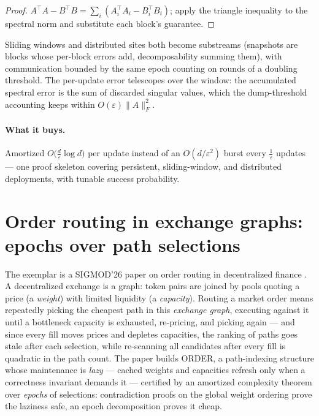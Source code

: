 \begin{proof}
$A^{\top} A - B^{\top} B = \sum_i (A_i^{\top} A_i - B_i^{\top} B_i)$;
apply the triangle inequality to the spectral norm and substitute each
block's guarantee.
\end{proof}

Sliding windows and distributed sites both become substreams (snapshots are
blocks whose per-block errors add, decomposability summing them), with
communication bounded by the same epoch counting on rounds of a doubling
threshold. The per-update error telescopes over the window: the
accumulated spectral error is the sum of discarded singular values, which
the dump-threshold accounting keeps within $O(\varepsilon)\|A\|_F^2$.

\paragraph{What it buys.}
Amortized $O\bigl(\tfrac{d}{\varepsilon} \log d\bigr)$ per update instead
of an $O(d/\varepsilon^2)$ burst every $\tfrac{1}{\varepsilon}$ updates ---
one proof skeleton covering persistent, sliding-window, and distributed
deployments, with tunable success probability.

\section{Order routing in exchange graphs: epochs over path selections}
\label{sec:amo-order}

The exemplar is a SIGMOD'26 paper on order routing in decentralized finance
\citep{sigmod26-180}. A decentralized exchange is a graph: token pairs are
joined by pools quoting a price (a \emph{weight}) with limited liquidity (a
\emph{capacity}). Routing a market order means repeatedly picking the
cheapest path in this \emph{exchange graph}, executing against it until a
bottleneck capacity is exhausted, re-pricing, and picking again --- and
since every fill moves prices and depletes capacities, the ranking of paths
goes stale after each selection, while re-scanning all candidates after
every fill is quadratic in the path count. The paper builds ORDER, a
path-indexing structure whose maintenance is \emph{lazy} --- cached weights
and capacities refresh only when a correctness invariant demands it ---
certified by an amortized complexity theorem over \emph{epochs} of
selections: contradiction proofs on the global weight ordering prove the
laziness safe, an epoch decomposition proves it cheap.

